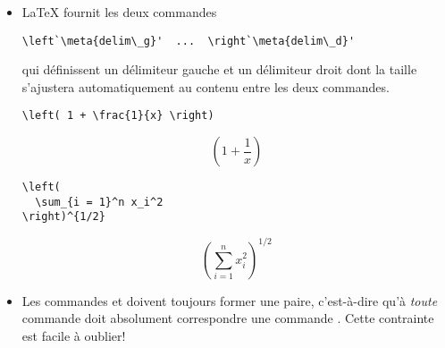 \begin{itemize}
\item {\LaTeX} fournit les deux commandes
\begin{lstlisting}
\left`\meta{delim\_g}'  ...  \right`\meta{delim\_d}'
\end{lstlisting}
  qui définissent un délimiteur gauche  et un
  délimiteur droit  dont la taille s'ajustera
  automatiquement au contenu entre les deux commandes.
  \begin{demo}
    \begin{texample}
\begin{lstlisting}
\left( 1 + \frac{1}{x} \right)
\end{lstlisting}
      \producing
      \begin{equation*}
        \left( 1 + \frac{1}{x} \right)
      \end{equation*}
    \end{texample}

    \begin{texample}
\begin{lstlisting}
\left(
  \sum_{i = 1}^n x_i^2
\right)^{1/2}
\end{lstlisting}
      \producing
      \begin{equation*}
        \left(
          \sum_{i = 1}^n x_i^2
        \right)^{1/2}
      \end{equation*}
    \end{texample}
  \end{demo}
\item Les commandes \cmd{\left} et \cmd{\right} doivent toujours
  former une paire, c'est-à-dire qu'à \emph{toute} commande
  \cmdprint{\left} doit absolument correspondre une commande
    \cmdprint{\right}. Cette contrainte est facile à oublier!


\end{itemize}
